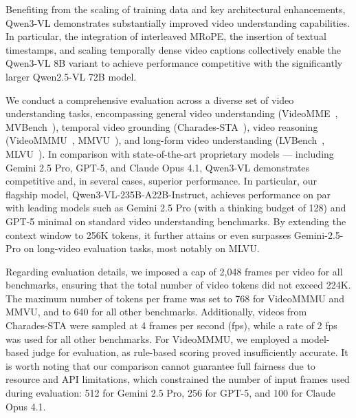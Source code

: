 Benefiting from the scaling of training data and key architectural enhancements, Qwen3-VL demonstrates substantially improved video understanding capabilities. In particular, the integration of interleaved MRoPE, the insertion of textual timestamps, and scaling temporally dense video captions collectively enable the Qwen3-VL 8B variant to achieve performance competitive with the significantly larger Qwen2.5-VL 72B model.

We conduct a comprehensive evaluation across a diverse set of video understanding tasks, encompassing general video understanding (VideoMME~\citep{fu2024video}, MVBench~\citep{li2024mvbench}), temporal video grounding (Charades-STA~\citep{gao2017tall}), video reasoning (VideoMMMU~\citep{hu2025video}, MMVU~\citep{zhao2025mmvu}), and long-form video understanding (LVBench~\citep{wang2024lvbench}, MLVU~\citep{zhou2024mlvu}). In comparison with state-of-the-art proprietary models — including Gemini 2.5 Pro, GPT-5, and Claude Opus 4.1, Qwen3-VL demonstrates competitive and, in several cases, superior performance.
In particular, our flagship model, Qwen3-VL-235B-A22B-Instruct, achieves performance on par with leading models such as Gemini 2.5 Pro (with a thinking budget of 128) and GPT-5 minimal on standard video understanding benchmarks. By extending the context window to 256K tokens, it further attains or even surpasses Gemini-2.5-Pro on long-video evaluation tasks, most notably on MLVU. 

Regarding evaluation details, we imposed a cap of 2,048 frames per video for all benchmarks, ensuring that the total number of video tokens did not exceed 224K. The maximum number of tokens per frame was set to 768 for VideoMMMU and MMVU, and to 640 for all other benchmarks. Additionally, videos from Charades-STA were sampled at 4 frames per second (fps), while a rate of 2 fps was used for all other benchmarks. For VideoMMMU, we employed a model-based judge for evaluation, as rule-based scoring proved insufficiently accurate. It is worth noting that our comparison cannot guarantee full fairness due to resource and API limitations, which constrained the number of input frames used during evaluation: 512 for Gemini 2.5 Pro, 256 for GPT-5, and 100 for Claude Opus 4.1. 
